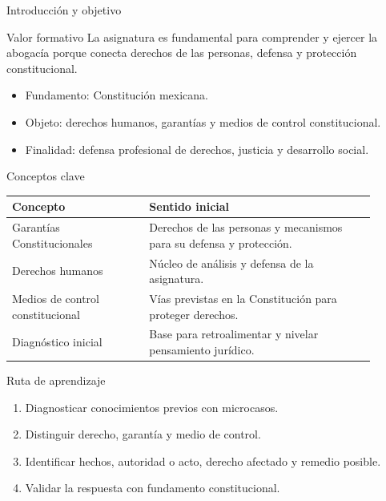 \documentclass[
  spanish,
  aspectratio=169,
  xcolor={dvipsnames,table}
]{beamer}
\begin{document}
\begin{frame}{Introducción y objetivo}
  \begin{block}{Valor formativo}
    La asignatura es fundamental para comprender y ejercer la abogacía porque conecta derechos de las personas, defensa y protección constitucional.
  \end{block}
  \begin{itemize}
    \item Fundamento: Constitución mexicana.
    \item Objeto: derechos humanos, garantías y medios de control constitucional.
    \item Finalidad: defensa profesional de derechos, justicia y desarrollo social.
  \end{itemize}
\end{frame}

\begin{frame}{Conceptos clave}
  \begin{tabular}{p{0.34\linewidth}p{0.56\linewidth}}
    \toprule
    \textbf{Concepto} & \textbf{Sentido inicial} \\
    \midrule
    Garantías Constitucionales & Derechos de las personas y mecanismos para su defensa y protección. \\
    Derechos humanos & Núcleo de análisis y defensa de la asignatura. \\
    Medios de control constitucional & Vías previstas en la Constitución para proteger derechos. \\
    Diagnóstico inicial & Base para retroalimentar y nivelar pensamiento jurídico. \\
    \bottomrule
  \end{tabular}
\end{frame}

\begin{frame}{Ruta de aprendizaje}
  \begin{enumerate}
    \item Diagnosticar conocimientos previos con microcasos.
    \item Distinguir derecho, garantía y medio de control.
    \item Identificar hechos, autoridad o acto, derecho afectado y remedio posible.
    \item Validar la respuesta con fundamento constitucional.
  \end{enumerate}
\end{frame}
\end{document}
